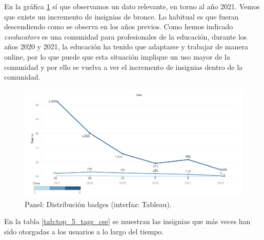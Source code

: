 \documentclass[a4paper, 12pt]{book}
\begin{document}
En la gráfica \ref{figura:badges} sí que observamos un dato relevante, en torno al año 2021. Vemos que existe un incremento de insignias de bronce. Lo habitual es que fueran descendiendo como se observa en los años previos. Como hemos indicado \emph{cseducators} es una comunidad para profesionales de la educación, durante los años 2020 y 2021, la educación ha tenido que adaptarse y trabajar de manera online, por lo que puede que esta situación implique un uso mayor de la comunidad y por ello se vuelva a ver el incremento de insignias dentro de la comunidad.

\begin{figure}[ht]
    \centering
    \includegraphics[width=\textwidth]{img/cse/badges.png}
    \caption{Panel: Distribución badges (interfaz: Tableau).}
    \label{figura:badges}
\end{figure}


En la tabla \ref{tab:top_5_tags_cse} se muestran las insignias que más veces han sido otorgadas a los usuarios a lo largo del tiempo. 
\end{document}
